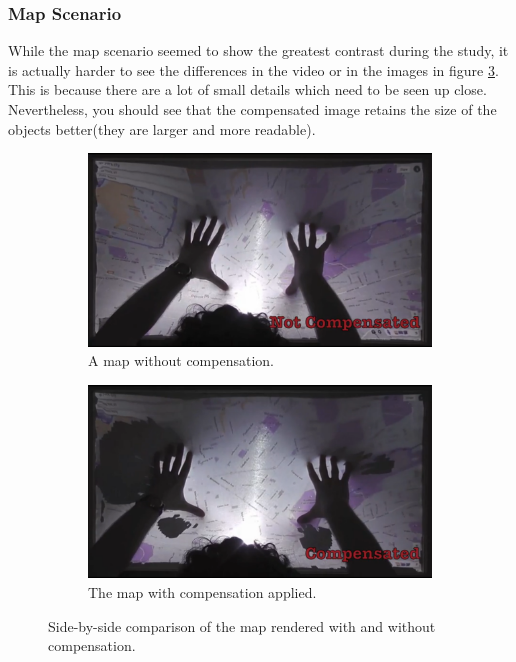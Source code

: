 \documentclass[]{article}
\begin{document}
\subsubsection{Map Scenario}

While the map scenario seemed to show the greatest contrast during the study, it is actually harder to see the differences in the video or in the images in figure \ref{fig:MapComparison}. This is because there are a lot of small details which need to be seen up close. Nevertheless, you should see that the compensated image retains the size of the objects better(they are larger and more readable).

\begin{figure}[!h]
\centering
\begin{subfigure}{.5\textwidth}
  \centering
  \includegraphics[width=0.9\linewidth]{figures/compensation/MapNotCompensated.png}
  \caption{A map without compensation.}
  \label{fig:MapNotCompensated}
\end{subfigure}%
\begin{subfigure}{.5\textwidth}
  \centering
  \includegraphics[width=0.9\linewidth]{figures/compensation/MapCompensated.png}
  \caption{The map with compensation applied.}
  \label{fig:MapCompensated}
\end{subfigure}
\caption{Side-by-side comparison of the map rendered with and without compensation.}
\label{fig:MapComparison}
\end{figure}
\end{document}
